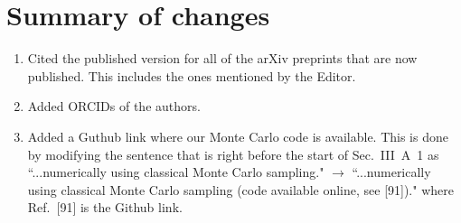 \documentclass[
onecolumn,
superscriptaddress,
longbibliography,
nofootinbib,
 amsmath,amssymb,
 aps,
prb
]{revtex4-2}
\begin{document}






\noindent\makebox[\linewidth]{\rule{\textwidth}{0.4pt}}
\section{Summary of changes}

\begin{enumerate}
\item Cited the published version for all of the arXiv preprints that are now published. This includes the ones mentioned by the Editor.
\item Added ORCIDs of the authors.
\item Added a Guthub link where our Monte Carlo code is available. This is done by modifying the sentence that is right before the start of Sec.~III~A~1 as ``...numerically using classical Monte Carlo sampling." $\rightarrow$ ``...numerically using classical Monte Carlo sampling (code available online, see [91])." where Ref.~[91] is the Github link.
\end{enumerate}





\end{document}
